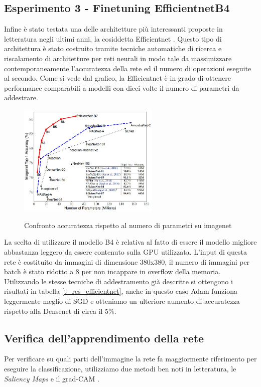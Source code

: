 \subsection{Esperimento 3 - Finetuning EfficientnetB4}
Infine è stato testata una delle architetture più interessanti proposte in letteratura negli ultimi anni, la cosiddetta Efficientnet \cite{tan2019efficientnet}.
Questo tipo di architettura è stato costruito tramite tecniche automatiche di ricerca e riscalamento di architetture per reti neurali in modo tale da massimizzare contemporaneamente l'accuratezza della rete ed il numero di operazioni eseguite al secondo.
Come si vede dal grafico, la Efficientnet è in grado di ottenere performance comparabili a modelli con dieci volte il numero di parametri da addestrare.
\begin{figure}[H]

\centering
\includegraphics[width=0.6\textwidth]{images/efficientnet} 
\label{fig_efficientnet}
\caption{Confronto accuratezza rispetto al numero di parametri su imagenet}
\end{figure} 
La scelta di utilizzare il modello B4 è relativa al fatto di essere il modello migliore abbastanza leggero da essere contenuto sulla GPU utilizzata.
L'input di questa rete è costituito da immagini di dimensione 380x380, il numero di immagini per batch è stato ridotto a 8 per non incappare in overflow della memoria.
Utilizzando le stesse tecniche di addestramento già descritte si ottengono i risultati in tabella \ref{t_res_efficientnet}, anche in questo caso Adam funziona leggermente meglio di SGD e otteniamo un ulteriore aumento di accuratezza rispetto alla Densenet di circa il 5\%.

\subsection{Verifica dell'apprendimento della rete}
Per verificare su quali parti dell'immagine la rete fa maggiormente riferimento per eseguire la classificazione, utilizziamo due metodi ben noti in letteratura, le \textit{Saliency Maps} \cite{simonyan2013deep} e il grad-CAM \cite{Selvaraju_2019}.
